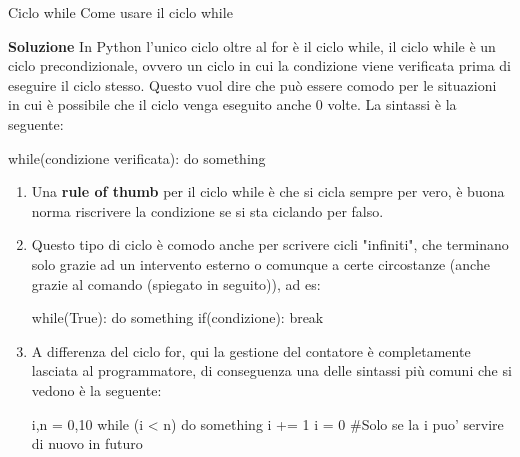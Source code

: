 \documentclass[10pt]{extarticle}
\makeatletter
\newcommand{\<}{\langle}
\renewcommand{\>}{\rangle}
\renewenvironment{proof}[1][\proofname] {\par\pushQED{\qed}
\renewcommand*{\proofname}{Soluzione}
{\normalfont\sffamily\bfseries\topsep6\p@\@plus6\p@\relax #1\@addpunct{.} }}{\popQED\endtrivlist\@endpefalse}
\theoremstyle{mystyle}{\newtheorem*{remark}{Nota}}
\theoremstyle{mystyle}{\newtheorem*{remarks}{Note}}
\theoremstyle{mystyle}{\newtheorem*{example}{Esempio}}
\theoremstyle{mystyle}{\newtheorem*{examples}{Esempi}}
\theoremstyle{definition}{\newtheorem*{exercise}{Exercise}}
\theoremstyle{warn}
\makeatother
\begin{document}
\begin{definition}{Ciclo while}{}
Come usare il ciclo while
\end{definition}
\begin{proof}
In Python l'unico ciclo oltre al for è il ciclo while, il ciclo while è un ciclo precondizionale, ovvero un ciclo in cui la condizione viene verificata prima di eseguire il ciclo stesso. Questo vuol dire che può essere comodo per le situazioni in cui è possibile che il ciclo venga eseguito anche 0 volte. La sintassi è la seguente:
\begin{python}
while(condizione verificata):
    do something
\end{python}
\end{proof}
\begin{remarks} \leavevmode
\begin{enumerate}
    \item Una  \textbf{rule of thumb} per il ciclo while è che si cicla sempre per vero, è buona norma riscrivere la condizione se si sta ciclando per falso.
    \item Questo tipo di ciclo è comodo anche per scrivere cicli "infiniti", che terminano solo grazie ad un intervento esterno o comunque a certe circostanze (anche grazie al comando  (spiegato in seguito)), ad es:
    \begin{python}
while(True):
    do something
    if(condizione):
        break
    \end{python}
    \item A differenza del ciclo for, qui la gestione del contatore è completamente lasciata al programmatore, di conseguenza una delle sintassi più comuni che si vedono è la seguente:
    \begin{python}
i,n = 0,10
while (i < n)
    do something
    i += 1
i = 0 #Solo se la i puo' servire di nuovo in futuro
    \end{python}
\end{enumerate}
\end{remarks}
\end{document}
